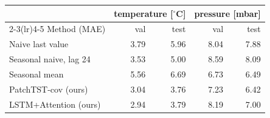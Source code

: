 \begin{tabular}{lrrrr}
\toprule
& \multicolumn{2}{c}{temperature [$^{\circ}$C]} & \multicolumn{2}{c}{pressure [mbar]} \\
\cmidrule(lr){2-3}\cmidrule(lr){4-5}
Method (MAE) & val & test & val & test \\
\midrule
Naive last value & 3.79 & 5.96 & 8.04 & 7.88 \\
Seasonal naive, lag 24 & 3.53 & 5.00 & 8.59 & 8.09 \\
Seasonal mean & 5.56 & 6.69 & 6.73 & 6.49 \\
\midrule
PatchTST-cov (ours) & 3.04 & 3.76 & 7.23 & 6.42 \\
LSTM+Attention (ours) & 2.94 & 3.79 & 8.19 & 7.00 \\
\bottomrule
\end{tabular}
